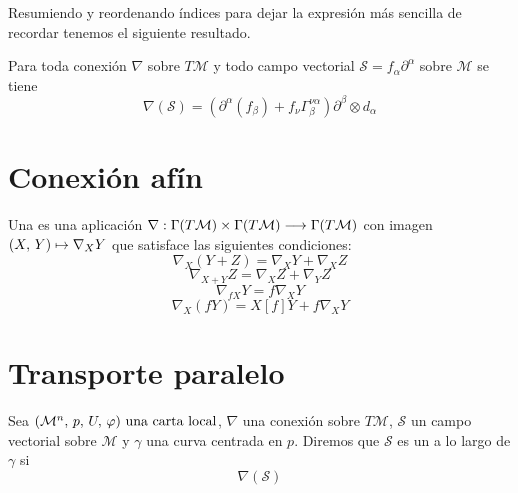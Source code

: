 Resumiendo y reordenando índices para dejar la expresión más sencilla de recordar tenemos el siguiente resultado.
\begin{proposition}
  Para toda conexión $\nabla$ sobre $T\mathcal{M}$ y todo campo vectorial $\mathcal{S}=f_\alpha\partial^\alpha$
  sobre $\mathcal{\mathcal{M}}$ se tiene
  \begin{equation}
    \label{eq:conexion-coordenadas}
    \nabla(\mathcal{S}) = (\partial^\alpha(f_\beta)+f_\nu\Gamma_\beta^{\nu\alpha})\partial^\beta\otimes d_\alpha
  \end{equation}
\end{proposition}

\section{Conexión afín}\label{sec:conexion-affin}
\begin{definition}
  Una  es una aplicación $\nabla:\Gamma(T\mathcal{M})\times\Gamma(T\mathcal{M})\longrightarrow \Gamma(T\mathcal{M})$
  con imagen $(X,\thinspace Y)\mapsto\nabla_X Y$ que satisface las siguientes condiciones:
  \begin{equation}\label{eq:conexion-afin-condicion-1}
    \nabla_X (Y+Z) = \nabla_X Y + \nabla_X Z
  \end{equation}
  \begin{equation}\label{eq:conexion-afin-condicion-2}
    \nabla_{X+Y} Z = \nabla_X Z + \nabla_Y Z
  \end{equation}
  \begin{equation}\label{eq:conexion-afin-condicion-3}
    \nabla_{fX} Y = f\nabla_X Y
  \end{equation}
  \begin{equation}\label{eq:conexion-afin-condicion-4}
    \nabla_X (fY) = X[f] Y + f\nabla_X Y
  \end{equation}
\end{definition}


\section{Transporte paralelo}\label{sec:transporte-paralelo}
\begin{definition}
  Sea $(\mathcal{M}^n,\thinspace p,\thinspace U,\thinspace \varphi)\textmd{ una carta local}$, $\nabla$ una conexión sobre $T\mathcal{M}$, $\mathcal{S}$ un campo vectorial sobre
  $\mathcal{\mathcal{M}}$ y $\gamma$ una curva centrada en $p$. Diremos que $\mathcal{S}$ es un  a lo
  largo de $\gamma$ si
  \begin{equation}
    \nabla(\mathcal{S})
  \end{equation}
\end{definition}